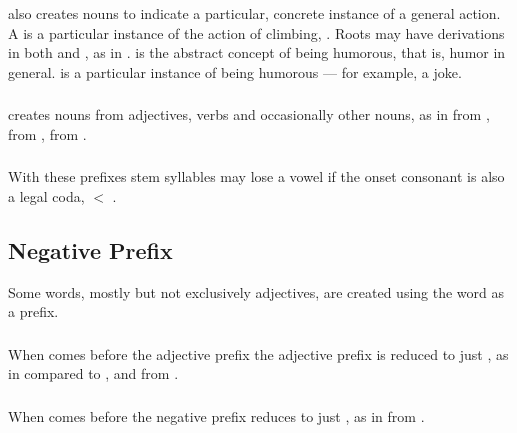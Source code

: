 \subsubsection{}  also creates nouns to indicate a particular,
concrete instance of a general action. A   is a
particular instance of the action of climbing, .  Roots may
have derivations in both  and , as in 
.   is the abstract concept of being humorous,
that is, humor in general.   is a particular instance of being
humorous --- for example, a joke.\\

\subsubsection{}  creates nouns from adjectives, verbs and
occasionally other nouns, as in   from
 ,   from
 ,   from 
. 

\subsubsection{} With these prefixes stem syllables may lose a vowel
if the onset consonant is also a legal coda, 
 $<$  .


\subsection{Negative Prefix} Some words, mostly but not exclusively
adjectives, are created using the word   as a prefix.

\subsubsection{} When  comes before the adjective prefix
 the adjective prefix is reduced to just , as in
  compared to 
, and   from
 .

\subsubsection{} When  comes before  the negative prefix
reduces to just , as in   from
 .

